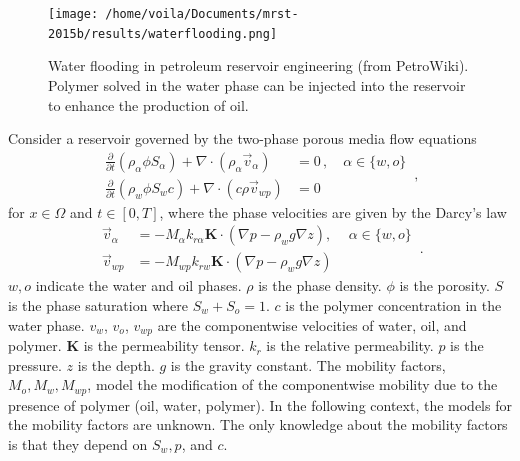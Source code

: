 \begin{figure}[htbp]
    \begin{center}
        \texttt{[image: /home/voila/Documents/mrst-2015b/results/waterflooding.png]}
        \caption{Water flooding in petroleum reservoir engineering (from PetroWiki). Polymer 
                 solved in the water phase can be injected into the reservoir to enhance the
                 production of oil.}
        \label{fig: polymer sketch}
    \end{center}
\end{figure}

Consider a reservoir governed by the two-phase porous media flow equations
\begin{equation}\begin{split}
    \frac{\partial }{\partial t} \left(\rho_\alpha \phi S_\alpha \right) + \nabla \cdot
    \left( \rho_\alpha \vec{v}_{\alpha} \right) &= 0\,, \quad \alpha \in \{w,o\}\\
    \frac{\partial}{\partial t}\left( \rho_w \phi S_w c \right) + \nabla \cdot
    \left( c \rho \vec{v}_{wp}\right) &= 0        
    \end{split}\,,
    \label{eqn: two phase polymer}
\end{equation}
for $x\in \Omega$ and $t\in [0,T]$,
where the phase velocities are given by the Darcy's law
\begin{equation}\begin{split}
    \vec{v}_\alpha &= - {M_\alpha} k_{r\alpha} \boldsymbol{K} \cdot (\nabla p - \rho_w g \nabla z), \, \quad \alpha \in \{w,o\}\\
    \vec{v}_{wp} &= -{M_{wp}} k_{rw} \boldsymbol{K} \cdot (\nabla p - \rho_{w} g \nabla z)
\end{split}\,.
\label{eqn: darcy law}
\end{equation}
$w, o$ indicate the water and oil phases.
$\rho$ is the phase density. $\phi$ is the porosity. $S$ is the phase saturation where
$S_w+S_o=1$.
$c$ is the polymer concentration in the water phase. $v_{w}$, $v_{o}$, 
$v_{wp}$ are the componentwise velocities of water, oil, and polymer. 
$\boldsymbol{K}$
is the permeability tensor. $k_{r}$ is the relative permeability. $p$ is the pressure. $z$ is the depth.
$g$ is the gravity constant. The mobility factors, $M_o, M_w, M_{wp}$, 
model the modification of the componentwise mobility due to the presence of polymer (oil,
water, polymer).
In the following context, the models for the mobility factors are unknown. The only 
knowledge about the mobility factors is that they depend on $S_w, p$, and $c$.\\


